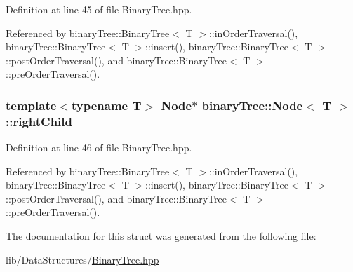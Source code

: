 Definition at line 45 of file Binary\-Tree.\-hpp.



Referenced by binary\-Tree\-::\-Binary\-Tree$<$ T $>$\-::in\-Order\-Traversal(), binary\-Tree\-::\-Binary\-Tree$<$ T $>$\-::insert(), binary\-Tree\-::\-Binary\-Tree$<$ T $>$\-::post\-Order\-Traversal(), and binary\-Tree\-::\-Binary\-Tree$<$ T $>$\-::pre\-Order\-Traversal().

\hypertarget{structbinaryTree_1_1Node_ad80da15e3643639a0e9ff964c9d83ae9}{
\subsubsection[{right\-Child}]{\setlength{\rightskip}{0pt plus 5cm}template$<$typename T$>$ {\bf Node}$\ast$ {\bf binary\-Tree\-::\-Node}$<$ T $>$\-::right\-Child}}\label{structbinaryTree_1_1Node_ad80da15e3643639a0e9ff964c9d83ae9}


Definition at line 46 of file Binary\-Tree.\-hpp.



Referenced by binary\-Tree\-::\-Binary\-Tree$<$ T $>$\-::in\-Order\-Traversal(), binary\-Tree\-::\-Binary\-Tree$<$ T $>$\-::insert(), binary\-Tree\-::\-Binary\-Tree$<$ T $>$\-::post\-Order\-Traversal(), and binary\-Tree\-::\-Binary\-Tree$<$ T $>$\-::pre\-Order\-Traversal().



The documentation for this struct was generated from the following file\-:\begin{DoxyCompactItemize}
\item 
lib/\-Data\-Structures/\hyperlink{BinaryTree_8hpp}{Binary\-Tree.\-hpp}\end{DoxyCompactItemize}
